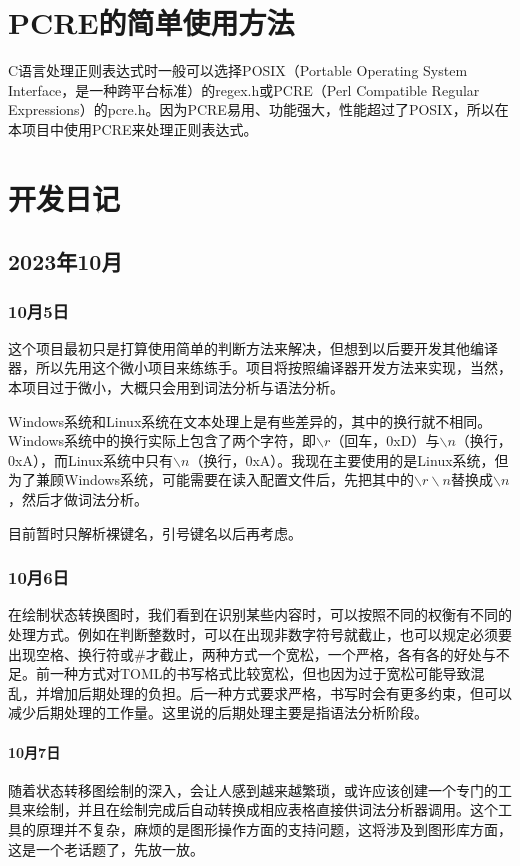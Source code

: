 \appendix


\chapter{PCRE的简单使用方法}
C语言处理正则表达式时一般可以选择POSIX（Portable Operating System Interface，是一种跨平台标准）的regex.h或PCRE（Perl Compatible Regular Expressions）的pcre.h。因为PCRE易用、功能强大，性能超过了POSIX，所以在本项目中使用PCRE来处理正则表达式。


\chapter{开发日记}


\section{2023年10月}


\subsection{10月5日}
这个项目最初只是打算使用简单的判断方法来解决，但想到以后要开发其他编译器，所以先用这个微小项目来练练手。项目将按照编译器开发方法来实现，当然，本项目过于微小，大概只会用到词法分析与语法分析。

Windows系统和Linux系统在文本处理上是有些差异的，其中的换行就不相同。Windows系统中的换行实际上包含了两个字符，即$\backslash r$（回车，0xD）与$\backslash n$（换行，0xA），而Linux系统中只有$\backslash n$（换行，0xA）。我现在主要使用的是Linux系统，但为了兼顾Windows系统，可能需要在读入配置文件后，先把其中的$\backslash r\backslash n$替换成$\backslash n$，然后才做词法分析。

目前暂时只解析裸键名，引号键名以后再考虑。


\subsection{10月6日}
在绘制状态转换图时，我们看到在识别某些内容时，可以按照不同的权衡有不同的处理方式。例如在判断整数时，可以在出现非数字符号就截止，也可以规定必须要出现空格、换行符或\#才截止，两种方式一个宽松，一个严格，各有各的好处与不足。前一种方式对TOML的书写格式比较宽松，但也因为过于宽松可能导致混乱，并增加后期处理的负担。后一种方式要求严格，书写时会有更多约束，但可以减少后期处理的工作量。这里说的后期处理主要是指语法分析阶段。


\subsubsection{10月7日}
随着状态转移图绘制的深入，会让人感到越来越繁琐，或许应该创建一个专门的工具来绘制，并且在绘制完成后自动转换成相应表格直接供词法分析器调用。这个工具的原理并不复杂，麻烦的是图形操作方面的支持问题，这将涉及到图形库方面，这是一个老话题了，先放一放。


